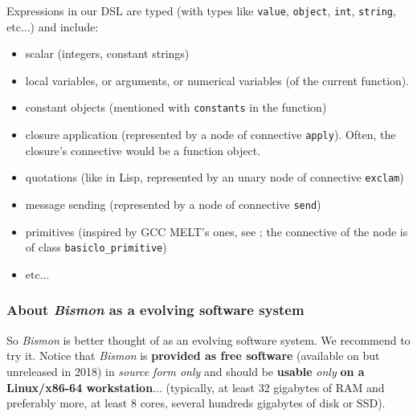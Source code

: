 Expressions in our DSL are typed (with types like \texttt{value},
\texttt{object}, \texttt{int}, \texttt{string}, etc...)  and include:

\begin{itemize}
\item scalar (integers, constant strings)
  
\item local variables, or arguments, or numerical variables (of the current function).

\item constant objects (mentioned with \texttt{constants} in the function)

\item closure application (represented by a node of connective \texttt{apply}). Often, the closure's connective would be a
  function object.

  \item quotations (like in Lisp, represented by an unary node of
    connective \texttt{exclam})

\item message sending (represented by a node of connective \texttt{send})

\item primitives (inspired by GCC MELT's ones, see
  \cite{Starynkevitch-DSL2011}; the connective of the node is of class
  \texttt{basiclo\_primitive})

\item etc...
  
\end{itemize}
  

\subsubsection{About \emph{Bismon} as a evolving software system}
\label{subsubsec:bismon-evolving}

So \emph{Bismon} is better thought of as an evolving software
system. We recommend to try it. Notice that \textit{Bismon} is
\textbf{provided as free software} (available
on  but unreleased in 2018) in \emph{source form only}
and should be \textbf{usable} \emph{only} \textbf{on a Linux/x86-64
  workstation}... (typically, at least 32 gigabytes of RAM and
preferably more, at least 8 cores, several hundreds gigabytes of disk
or SSD).

